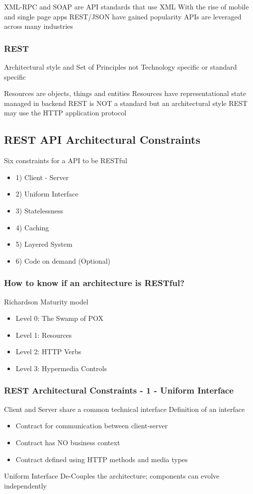 XML-RPC and SOAP are API standards that use XML
With the rise of mobile and single page apps REST/JSON have gained popularity
APIs are leveraged across many industries

\subsubsection{REST}
Architectural style and Set of Principles not Technology specific or standard specific

Resources are objects, things and entities
Resources have representational state managed in backend
REST is NOT a standard but an architectural style
REST may use the HTTP application protocol

\subsection{REST API Architectural Constraints}
Six constraints for a API to be RESTful
\begin{itemize}
    \item 1) Client - Server
    \item 2) Uniform Interface
    \item 3) Statelessness
    \item 4) Caching
    \item 5) Layered System
    \item 6) Code on demand (Optional)
\end{itemize}

\subsubsection{How to know if an architecture is RESTful?}
Richardson Maturity model
\begin{itemize}
    \item Level 0: The Swamp of POX
    \item Level 1: Resources
    \item Level 2: HTTP Verbs
    \item Level 3: Hypermedia Controls
\end{itemize}

\subsubsection{REST Architectural Constraints - 1 - Uniform Interface}
Client and Server share a common technical interface
Definition of an interface
\begin{itemize}
    \item Contract for communication between client-server
    \item Contract has NO business context
    \item Contract defined using HTTP methods and media types
\end{itemize}
Uniform Interface De-Couples the architecture; components can evolve independently

